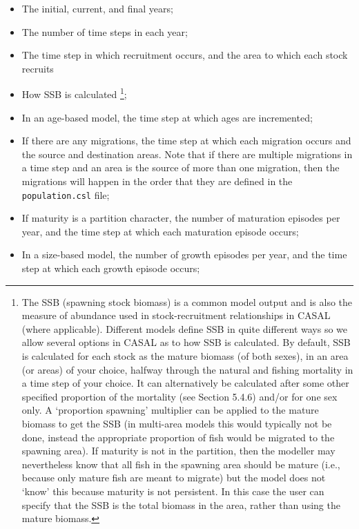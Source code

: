 \begin{itemize}
\item	The initial, current, and final years;
\item	The number of time steps in each year;
\item	The time step in which recruitment occurs, and the area to which each stock recruits
\item	How SSB is calculated \footnote{The SSB (spawning stock biomass) is a common model output and is also the measure of abundance used in stock-recruitment relationships in CASAL (where applicable). Different models define SSB in quite different ways so we allow several options in CASAL as to how SSB is calculated. By default, SSB is calculated for each stock as the mature biomass (of both sexes), in an area (or areas) of your choice, halfway through the natural and fishing mortality in a time step of your choice. It can alternatively be calculated after some other specified proportion of the mortality (see Section 5.4.6) and/or for one sex only. A ‘proportion spawning’ multiplier can be applied to the mature biomass to get the SSB (in multi-area models this would typically not be done, instead the appropriate proportion of fish would be migrated to the spawning area). If maturity is not in the partition, then the modeller may nevertheless know that all fish in the spawning area should be mature (i.e., because only mature fish are meant to migrate) but the model does not ‘know’ this because maturity is not persistent. In this case the user can specify that the SSB is the total biomass in the area, rather than using the mature biomass.};
\item	In an age-based model, the time step at which ages are incremented;
\item	If there are any migrations, the time step at which each migration occurs and the source and destination areas. Note that if there are multiple migrations in a time step and an area is the source of more than one migration, then the migrations will happen in the order that they are defined in the \texttt{population.csl} file;
\item	If maturity is a partition character, the number of maturation episodes per year, and the time step at which each maturation episode occurs;
\item	In a size-based model, the number of growth episodes per year, and the time step at which each growth episode occurs;

\end{itemize}
